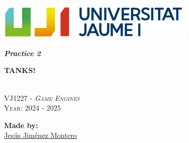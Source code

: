 \documentclass[12pt]{article}
\begin{document}
\pagecolor{pageColor}
\color{textColor}
\begin{titlepage}
    \vspace*{\fill}

    \centering
    \parbox{0.8\textwidth}{    %
        \includegraphics[width=0.7\textwidth]{imgs/marca-uji-color-fons-transparent.png}\par\vspace{1cm}

        {\Huge \bfseries \textit{Practice 2} \par}
        {\Large \bfseries TANKS! \par}

        \textsc{\large }
        \vspace{0.5cm} \\
        \textsc{\Large VJ1227 - \textit{Game Engines}}
        \vspace{0.5cm} \\
        \textsc{\large Year: 2024 - 2025}
        \vfill

        \textbf{Made by:}         \\
        \href{https://www.richardotomislav.com/}{Jesús Jiménez Montero}      \\
    }
    \vspace*{\fill}
\end{titlepage}



\hypertarget{toc}{}

\tableofcontents

\newpage

\newpage

\newpage



\end{document}
